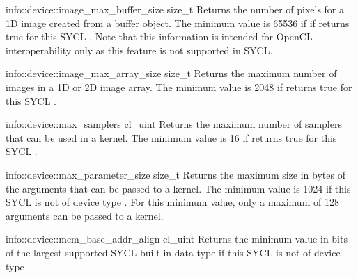   \addInfoRow
  {info::device::image_max_buffer_size}
  {size_t}
  {
      Returns the number of pixels for a 1D image created from a buffer object. The minimum value is 65536 if  if  returns true for this SYCL . Note that this information is intended for OpenCL interoperability only as this feature is not supported in SYCL.
  }

  \addInfoRow
  {info::device::image_max_array_size}
  {size_t}
  {
   Returns the maximum number of images in a 1D or 2D image array. The minimum value is 2048 if  returns true for this SYCL .
   }

  \addInfoRow
  {info::device::max_samplers}
  {cl_uint}
  {
   Returns the maximum number of samplers that can be used in a kernel.  The minimum value is 16 if  returns true for this SYCL .
    }

  \addInfoRow
  {info::device::max_parameter_size}
  {size_t}
  {
   Returns the maximum size in bytes of the arguments that can be passed to a kernel. The minimum value is 1024 if this SYCL  is not of device type . For this minimum value, only a maximum of 128 arguments can be passed to a kernel.
    }

  \addInfoRow
  {info::device::mem_base_addr_align}
  {cl_uint}
  {
   Returns the minimum value in bits of the largest supported SYCL built-in
    data type if this SYCL  is not of device type .
    }

